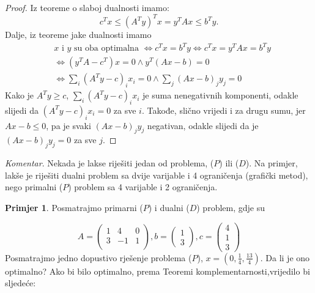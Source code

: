 \documentclass[a4paper, utf8, 11pt, colorlinks]{book}
\theoremstyle{definition}
\newtheorem{primjer}{Primjer}[chapter]
\begin{document}
\begin{proof}
         Iz teoreme o slaboj dualnosti imamo: 
         \begin{equation}
             c^Tx \leq ( A^T y)^T x = y^T A x \leq b^T y. 
         \end{equation}
         Dalje, iz teoreme jake dualnosti imamo  
         \begin{align*}
             &x \mbox{ i } y \mbox{ su oba optimalna } \Longleftrightarrow c^T x = b^T y \Longleftrightarrow c^Tx = y^TA x = b^Ty \\
             &\Longleftrightarrow (y^T A - c^T) x = 0 \wedge y^T(Ax - b )  = 0\\
             & \Longleftrightarrow \sum_i (A^T y - c)_i x_i = 0 \wedge \sum_j (Ax - b)_j y_j = 0
         \end{align*}
         Kako je $A^Ty \geq c$, $\sum_i (A^T y - c)_i x_i$ je suma nenegativnih komponenti, odakle slijedi da   $(A^T y - c)_i x_i= 0$ za sve $i$. Takođe, slično vrijedi i za drugu sumu, jer $Ax - b \leq 0$, pa je svaki  $(Ax - b)_j y_j$ negativan, odakle slijedi da je $(Ax - b)_j y_j = 0$ za sve $j$.
\end{proof}

\emph{Komentar}.  Nekada je lakse riješiti jedan od problema, ($P$)  ili  ($D$).  Na primjer, lakše je riješiti dualni problem sa dvije varijable i 4 ograničenja (grafički metod), nego primalni  ($P$)  problem sa 4 varijable i 2 ograničenja. 

\begin{primjer} Posmatrajmo primarni  ($P$)  i dualni ($D$) problem, gdje su
	\end{primjer}
 
$$      A = \left(\begin{array}{ccc}
          1 &  4 & 0 \\
          3 & -1 & 1 \\
      \end{array} \right ), b = \left (\begin{array}{c}
           1 \\
           3
      \end{array}\right ), c =\left ( \begin{array}{c}
           4  \\
           1  \\
           3
      \end{array} \right )
 $$
Posmatrajmo jedno dopustivo rješenje problema  ($P$), $x = (0, \frac{1}{4}, \frac{13}{4})$. Da li je ono optimalno? Ako bi bilo optimalno,  prema Teoremi komplementarnosti,vrijedilo bi sljedeće:
\end{document}
